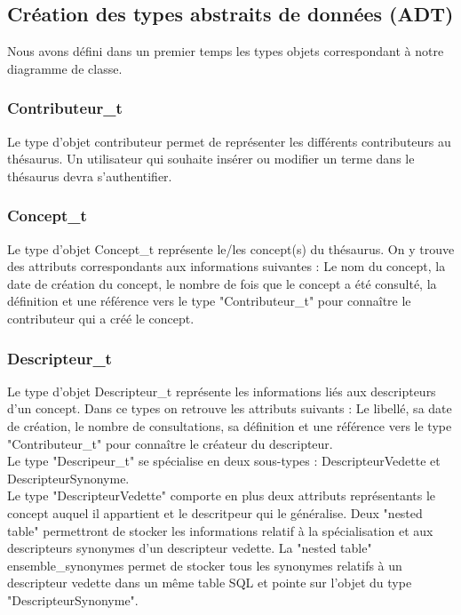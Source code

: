 \subsection{Création des types abstraits de données (ADT) }

Nous avons défini dans un premier temps les types objets correspondant à notre diagramme de classe.

\subsubsection{Contributeur\_t}
Le type d'objet contributeur permet de représenter les différents contributeurs au thésaurus. Un utilisateur qui souhaite insérer ou modifier un terme dans le thésaurus devra s'authentifier.

\subsubsection{Concept\_t}
Le type d'objet Concept\_t représente le/les concept(s) du thésaurus. On y trouve des attributs correspondants aux informations suivantes  : Le nom du concept, la date de création du concept, le nombre de fois que le concept a été consulté, la définition et une référence vers le type "Contributeur\_t" pour connaître le contributeur qui a créé le concept.


\subsubsection{Descripteur\_t}
Le type d'objet Descripteur\_t représente les informations liés aux descripteurs d'un concept. Dans ce types on retrouve les attributs suivants : Le libellé, sa date de création, le nombre de consultations, sa définition et une référence vers le type "Contributeur\_t" pour connaître le créateur du descripteur.\\

Le type "Descripeur\_t" se spécialise en deux sous-types : DescripteurVedette et DescripteurSynonyme.\\

Le type "DescripteurVedette" comporte en plus deux attributs représentants le concept auquel il appartient et le descritpeur qui le généralise. Deux "nested table" permettront de stocker les informations relatif à la spécialisation et aux descripteurs synonymes d'un descripteur vedette. La "nested table" ensemble\_synonymes permet de stocker tous les synonymes relatifs à un descripteur vedette dans un même table SQL et pointe sur l'objet du type "DescripteurSynonyme".\\



